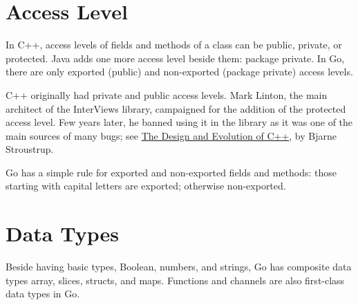 \documentclass[11pt]{article}
\begin{document}
\section{Access Level}
\label{sec:orgheadline15}
In C++, access levels of fields and methods of a class can be public, private, or protected. Java adds one more access level beside them: package private. In Go, there are only exported (public) and non-exported (package private) access levels.

C++ originally had private and public access levels. Mark Linton, the main architect of the InterViews library, campaigned for the addition of the protected access level. Few years later, he banned using it in the library as it was one of the main sources of many bugs; see \href{http://www.stroustrup.com/dne.html}{The Design and Evolution of C++}, by Bjarne Stroustrup.

Go has a simple rule for exported and non-exported fields and methods: those starting with capital letters are exported; otherwise non-exported.

\section{Data Types}
\label{sec:orgheadline18}
Beside having basic types, Boolean, numbers, and strings, Go has composite data types array, slices, structs, and maps. Functions and channels are also first-class data types in Go.
\end{document}
